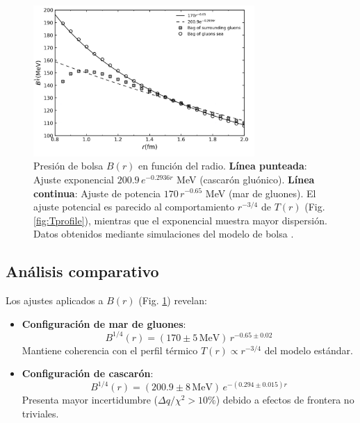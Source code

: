 \begin{figure}[h]
    \centering
    \includegraphics[width=0.75\textwidth]{./Images/B(R).png}
    \caption{
    Presión de bolsa $B(r)$ en función del radio. 
    \textbf{Línea punteada}: Ajuste exponencial $200.9\,e^{-0.2936r}$ MeV (cascarón gluónico). 
    \textbf{Línea continua}: Ajuste de potencia $170\,r^{-0.65}$ MeV (mar de gluones). 
    El ajuste potencial es parecido al comportamiento $r^{-3/4}$ de $T(r)$ (Fig. \ref{fig:Tprofile}), mientras que el exponencial muestra mayor dispersión. 
    Datos obtenidos mediante simulaciones del modelo de bolsa \cite{tan2019}.
    }
    \label{fig:Bpressure}
\end{figure}

\subsection{Análisis comparativo}
Los ajustes aplicados a $B(r)$ (Fig. \ref{fig:Bpressure}) revelan:

\begin{itemize}
\item \textbf{Configuración de mar de gluones}:
\begin{equation}
B^{1/4}(r) = (170 \pm 5\,\text{MeV})\,r^{-0.65 \pm 0.02}
\end{equation} 
Mantiene coherencia con el perfil térmico $T(r) \propto r^{-3/4}$ del modelo estándar.

\item \textbf{Configuración de cascarón}:
\begin{equation}
B^{1/4}(r) = (200.9 \pm 8\,\text{MeV})\,e^{-(0.294 \pm 0.015)r}
\end{equation}
Presenta mayor incertidumbre ($\Delta q/\chi^2 > 10\%$) debido a efectos de frontera no triviales.
\end{itemize}

